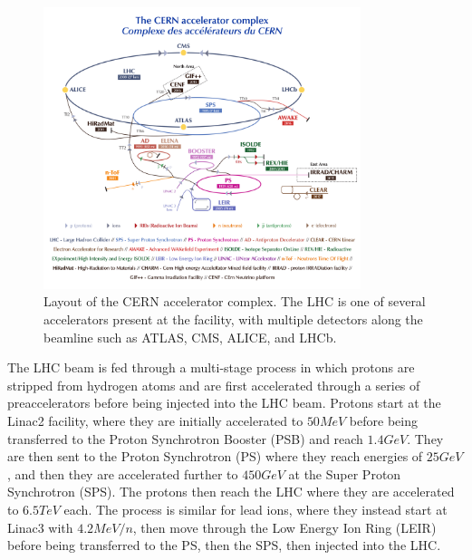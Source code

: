 \begin{figure}[htbp]
  \centering
  \includegraphics[width=0.825\textwidth]{fig/experiment/CCC-v2018-print-v2.pdf}
  \caption{
    Layout of the CERN accelerator complex.
    The LHC is one of several accelerators present at the facility, with multiple detectors along the beamline such as ATLAS, CMS, ALICE, and LHCb.
  }
  \label{fig:CERN}
\end{figure}

The LHC beam is fed through a multi-stage process in which protons are stripped from hydrogen atoms and are first accelerated through a series of preaccelerators before being injected into the LHC beam.
Protons start at the Linac2 facility, where they are initially accelerated to $50\unit{MeV}$ before being transferred to the Proton Synchrotron Booster (PSB) and reach $1.4\unit{GeV}$.
They are then sent to the Proton Synchrotron (PS) where they reach energies of $25\unit{GeV}$, and then they are accelerated further to $450\unit{GeV}$ at the Super Proton Synchrotron (SPS).
The protons then reach the LHC where they are accelerated to $6.5\unit{TeV}$ each.
The process is similar for lead ions, where they instead start at Linac3 with $4.2\unit{MeV/n}$, then move through the Low Energy Ion Ring (LEIR) before being transferred to the PS, then the SPS, then injected into the LHC.

